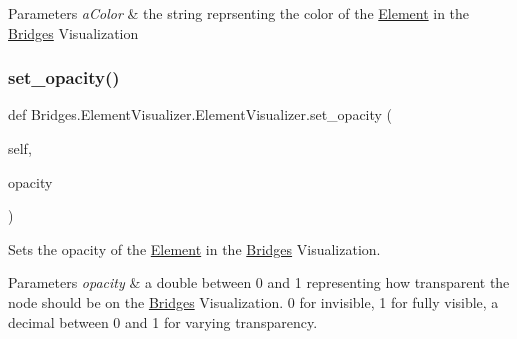 \begin{DoxyParams}{Parameters}
{\em a\+Color} & the string reprsenting the color of the \mbox{\hyperlink{namespace_bridges_1_1_element}{Element}} in the \mbox{\hyperlink{namespace_bridges_1_1_bridges}{Bridges}} Visualization \\
\hline
\end{DoxyParams}
\mbox{\label{class_bridges_1_1_element_visualizer_1_1_element_visualizer_a35f9781eaadd9ce1149cfbc8475a3c51}} 
\subsubsection{\texorpdfstring{set\+\_\+opacity()}{set\_opacity()}}
{\footnotesize\ttfamily def Bridges.\+Element\+Visualizer.\+Element\+Visualizer.\+set\+\_\+opacity (\begin{DoxyParamCaption}\item[{}]{self,  }\item[{}]{opacity }\end{DoxyParamCaption})}



Sets the opacity of the \mbox{\hyperlink{namespace_bridges_1_1_element}{Element}} in the \mbox{\hyperlink{namespace_bridges_1_1_bridges}{Bridges}} Visualization. 


\begin{DoxyParams}{Parameters}
{\em opacity} & a double between 0 and 1 representing how transparent the node should be on the \mbox{\hyperlink{namespace_bridges_1_1_bridges}{Bridges}} Visualization. 0 for invisible, 1 for fully visible, a decimal between 0 and 1 for varying transparency. \\
\hline
\end{DoxyParams}
\mbox{\label{class_bridges_1_1_element_visualizer_1_1_element_visualizer_a82348f58c951b0608ec4fb04eaa3e097}} 
